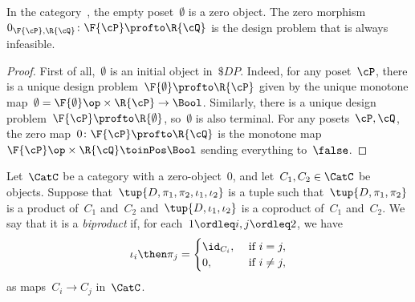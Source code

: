 \begin{lemma}
  In the category~\DP, the empty poset~$\emptyset$ is a zero object. The zero morphism~$0_{\F{\cP},\R{\cQ}}\colon \F{\cP} \profto \R{\cQ}$ is the design problem that is always infeasible.
\end{lemma}
\begin{proof}
  First of all,~$\emptyset$ is an initial object in~$\$DP$. Indeed, for any poset~$\cP $, there is a unique design problem~$\F{\emptyset} \profto \R{\cP}$ given by the unique monotone map~$\emptyset=\F{\emptyset}\op\times \R{\cP} \to\Bool$. Similarly, there is a unique design problem~$\F{\cP} \profto \R{\emptyset}$, so~$\emptyset$ is also terminal. For any posets~$\cP ,\cQ$, the zero map~$0 \colon \F{\cP} \profto \R{\cQ}$ is the monotone map~$\F{\cP} \op\times \R{\cQ} \toinPos \Bool$ sending everything to~$\false$.
\end{proof}

\begin{ctdefinition}[Biproduct]
  Let~$\CatC$ be a category with a zero-object~$0$, and let~$C_1,C_2\in\CatC$ be objects. Suppose that~$\tup{D,\pi_1,\pi_2,\iota_1,\iota_2}$ is a tuple such that~$\tup{D,\pi_1,\pi_2}$ is a product of~$C_1$ and~$C_2$ and~$\tup{D,\iota_1,\iota_2}$ is a coproduct of~$C_1$ and~$C_2$. We say that it is a \emph{biproduct} if, for each~$1\ordleq i,j\ordleq 2$, we have
  \begin{equation}
    \iota_i\then \pi_j=
    \begin{cases}
      \id_{C_i}, &\text{ if }i=j,\\
      0, &\text{ if }i\neq j,
    \end{cases} \label{eq:biproduct-condition}
  \end{equation}
  as maps~$C_i\to C_j$ in~$\CatC$.
\end{ctdefinition}

